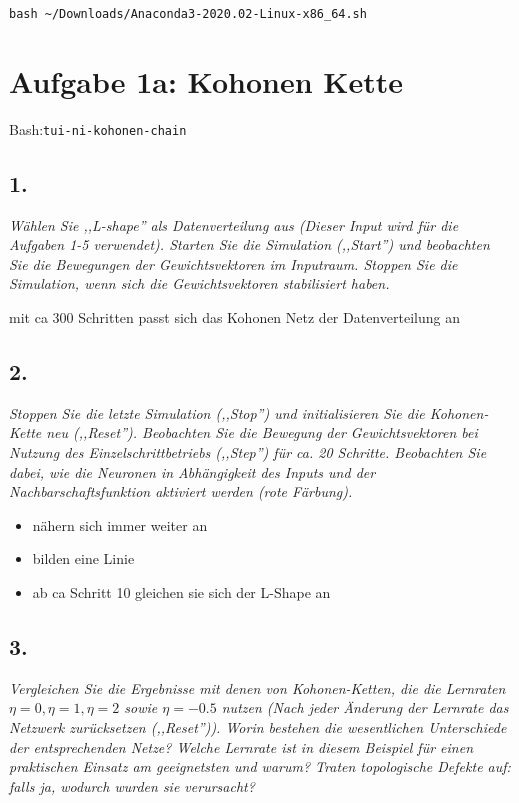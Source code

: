\documentclass[a4paper,10pt,titlepage]{scrartcl}
\begin{document}
\lstinline{bash ~/Downloads/Anaconda3-2020.02-Linux-x86_64.sh}

\section*{Aufgabe 1a: Kohonen Kette}
Bash:\lstinline{tui-ni-kohonen-chain}

\subsection*{1.}
\textit{Wählen Sie ,,L-shape'' als Datenverteilung aus (Dieser Input wird für die Aufgaben 1-5 verwendet). Starten Sie die Simulation (,,Start'') und beobachten Sie die Bewegungen der Gewichtsvektoren im Inputraum. Stoppen Sie die Simulation, wenn sich die Gewichtsvektoren stabilisiert haben.}

mit ca 300 Schritten passt sich das Kohonen Netz der Datenverteilung an

\subsection*{2.}
\textit{Stoppen Sie die letzte Simulation (,,Stop'') und initialisieren Sie die Kohonen-Kette neu (,,Reset''). Beobachten Sie die Bewegung der Gewichtsvektoren bei Nutzung des Einzelschrittbetriebs (,,Step'') für ca. 20 Schritte. Beobachten Sie dabei, wie die Neuronen in Abhängigkeit des Inputs und der Nachbarschaftsfunktion aktiviert werden (rote Färbung).}
\begin{itemize}
    \item nähern sich immer weiter an
    \item bilden eine Linie
    \item ab ca Schritt 10 gleichen sie sich der L-Shape an
\end{itemize}

\subsection*{3.}
\textit{Vergleichen Sie die Ergebnisse mit denen von Kohonen-Ketten, die die Lernraten $\eta=0, \eta=1, \eta=2$ sowie $\eta=-0.5$ nutzen (Nach jeder Änderung der Lernrate das Netzwerk zurücksetzen (,,Reset'')). Worin bestehen die wesentlichen Unterschiede der entsprechenden Netze? Welche Lernrate ist in diesem Beispiel für einen praktischen Einsatz am geeignetsten und warum? Traten topologische Defekte auf: falls ja, wodurch wurden sie verursacht?}
\end{document}
